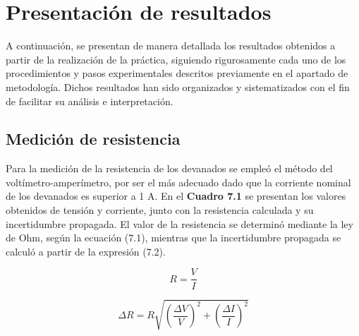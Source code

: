 \section{Presentación de resultados}

A continuación, se presentan de manera detallada los resultados obtenidos a partir de la realización de la práctica, siguiendo rigurosamente cada uno de los procedimientos y pasos experimentales descritos previamente en el apartado de metodología. Dichos resultados han sido organizados y sistematizados con el fin de facilitar su análisis e interpretación.

\subsection{Medición de resistencia}

Para la medición de la resistencia de los devanados se empleó el método del voltímetro-amperímetro, por ser el más adecuado dado que la corriente nominal de los devanados es superior a 1 A. En el \textbf{Cuadro 7.1} se presentan los valores obtenidos de tensión y corriente, junto con la resistencia calculada y su incertidumbre propagada. El valor de la resistencia se determinó mediante la ley de Ohm, según la ecuación (7.1), mientras que la incertidumbre propagada se calculó a partir de la expresión (7.2).

\begin{equation}
R = \frac{V}{I} \tag{7.1}
\end{equation}

\begin{equation}
\Delta R = R \sqrt{\left(\frac{\Delta V}{V}\right)^2 + \left(\frac{\Delta I}{I}\right)^2} \tag{7.2}
\end{equation}


